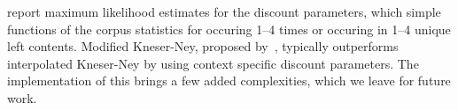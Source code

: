  report maximum likelihood estimates for the discount parameters, which simple functions of the corpus statistics for \ngrams occuring 1--4 times or occuring in 1--4 unique left contents. 
Modified Kneser-Ney, proposed by~, typically outperforms interpolated Kneser-Ney by using context specific discount parameters.
The implementation of this brings a few added complexities, which we leave for future work.


